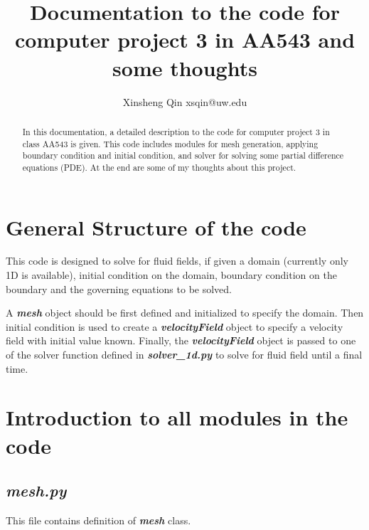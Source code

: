 \documentclass[11pt]{article}
\title{Documentation to the code for computer project 3 in AA543 and some thoughts}
\author{Xinsheng Qin xsqin@uw.edu}
\begin{document}
\maketitle

\begin{abstract}
In this documentation, a detailed description to the code for computer project 3 in class AA543 is given.
This code includes modules for mesh generation, applying boundary condition and initial condition, and solver for solving some partial difference equations (PDE). 
At the end are some of my thoughts about this project.
\end{abstract}

\section{General Structure of the code}
This code is designed to solve for fluid fields, if given a domain (currently only 1D is available), initial condition on the domain, boundary condition on the boundary and the governing equations to be solved.
\par

A \textbf{\textit{mesh}} object should be first defined and initialized to specify the domain. 
Then initial condition is used to create a \textbf{\textit{velocityField}} object to specify a velocity field with initial value known. 
Finally, the \textbf{\textit{velocityField}} object is passed to one of the solver function defined in \textbf{\textit{solver\_1d.py}} to solve for fluid field until a final time. 

\section{Introduction to all modules in the code}
    \subsection{\textbf{\textit{mesh.py}}}
    This file contains definition of \textbf{\textit{mesh}} class.
\end{document}
